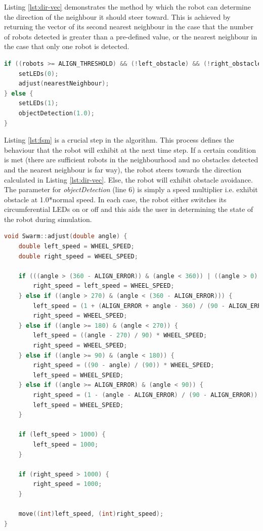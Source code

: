 Listing \ref{lst:dir-vec} demonstrates the method by which the robot can determine the direction of the neighbour it should steer toward. This is achieved by returning the vector of its second nearest neighbour in the case that the number of robots detected is greater than a pre-defined value, or the nearest neighbour in the case that only one robot is detected.
\clearpage

\begin{lstlisting}[language=C++, caption={Action for next step},label={lst:fsm}]
if ((robots >= ALIGN_THRESHOLD) && (!left_obstacle) && (!right_obstacle) && signalStrength[index] < 10) {
	setLEDs(0);
	adjust(nearestNeighbour);
} else {
	setLEDs(1);
	objectDetection(1.0);
}
\end{lstlisting}

Listing \ref{lst:fsm} is a crucial step in the algorithm. This process defines the behaviour that the robot will exhibit at the next time step. If a certain condition is met (there are sufficient robots in the neighbourhood and no obstacles detected and the nearest neighbour is far way), the robot steers towards the direction calculated in Listing \ref{lst:dir-vec}. Else, the robot will exhibit obstacle avoidance. The parameter for \textit{objectDetection} (line 6) is simply a speed multiplier i.e. exhibit obstacle at 1.0*normal speed. In each case, the robot either switches its circumferential LEDs on or off and this aids the user in determining the state of the robot during simulation.

\begin{lstlisting}[language=C++, caption={Adjust heading},label={lst:adjust}]
void Swarm::adjust(double angle) {
	double left_speed = WHEEL_SPEED;
	double right_speed = WHEEL_SPEED;

	if (((angle > (360 - ALIGN_ERROR)) & (angle < 360)) | ((angle > 0) & (angle < ALIGN_ERROR))) {
		right_speed = left_speed = WHEEL_SPEED;
	} else if ((angle > 270) & (angle < (360 - ALIGN_ERROR))) {
		left_speed = (1 + (ALIGN_ERROR + angle - 360) / (90 - ALIGN_ERROR)) * WHEEL_SPEED;
		right_speed = WHEEL_SPEED;
	} else if ((angle >= 180) & (angle < 270)) {
		left_speed = ((angle - 270) / 90) * WHEEL_SPEED;
		right_speed = WHEEL_SPEED;
	} else if ((angle >= 90) & (angle < 180)) {
		right_speed = ((90 - angle) / (90)) * WHEEL_SPEED;
		left_speed = WHEEL_SPEED;
	} else if ((angle >= ALIGN_ERROR) & (angle < 90)) {
		right_speed = (1 - (angle - ALIGN_ERROR) / (90 - ALIGN_ERROR)) * WHEEL_SPEED;
		left_speed = WHEEL_SPEED;
	}

	if (left_speed > 1000) {
		left_speed = 1000;
	}

	if (right_speed > 1000) {
		right_speed = 1000;
	}

	move((int)left_speed, (int)right_speed);
}
\end{lstlisting}

